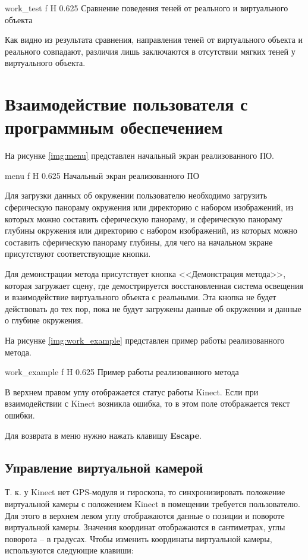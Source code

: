 {work_test}
{f}
{H}
{0.625\textwidth}
{Сравнение поведения теней от реального и виртуального объекта}

Как видно из результата сравнения, направления теней от виртуального объекта и реального совпадают, различия лишь заключаются в отсутствии мягких теней у виртуального объекта.

\section{Взаимодействие пользователя с программным обеспечением}

На рисунке \ref{img:menu} представлен начальный экран реализованного ПО.

{menu}
{f}
{H}
{0.625\textwidth}
{Начальный экран реализованного ПО}

Для загрузки данных об окружении пользователю необходимо загрузить сферическую панораму окружения или директорию с набором изображений, из которых можно составить сферическую панораму, и сферическую панораму глубины окружения или директорию с набором изображений, из которых можно составить сферическую панораму глубины, для чего на начальном экране присутствуют соответствующие кнопки.

Для демонстрации метода присутствует кнопка <<Демонстрация метода>>, которая загружает сцену, где демострируется восстановленная система освещения и взаимодействие виртуального объекта с реальными. Эта кнопка не будет действовать до тех пор, пока не будут загружены данные об окружении и данные о глубине окружения. 

На рисунке \ref{img:work_example} представлен пример работы реализованного метода.

{work_example}
{f}
{H}
{0.625\textwidth}
{Пример работы реализованного метода}

В верхнем правом углу отображается статус работы Kinect. Если при взаимодействии с Kinect возникла ошибка, то в этом поле отображается текст ошибки.

Для возврата в меню нужно нажать клавишу \textbf{Escape}.

\subsection{Управление виртуальной камерой}

Т. к. у Kinect нет GPS-модуля и гироскопа, то синхронизировать положение виртуальной камеры с положением Kinect в помещении требуется пользователю. Для этого в верхнем левом углу отображаются данные о позиции и повороте виртуальной камеры. Значения координат отображаются в сантиметрах, углы поворота -- в градусах. Чтобы изменить координаты виртуальной камеры, используются следующие клавиши:

